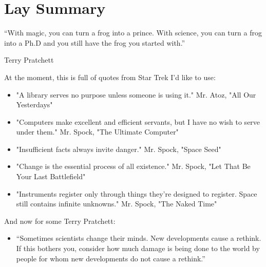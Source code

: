 \chapter{Lay Summary}
\epigraph{“With magic, you can turn a frog into a prince. With science, you can turn a frog into a Ph.D and you still have the frog you started with.”}{Terry Pratchett}

At the moment, this is full of quotes from Star Trek I'd like to use:

\begin{itemize}
    \item "A library serves no purpose unless someone is using it." Mr. Atoz, "All Our Yesterdays"
    \item "Computers make excellent and efficient servants, but I have no wish to serve under them." Mr. Spock, "The Ultimate Computer"
    \item "Insufficient facts always invite danger." Mr. Spock, "Space Seed"
    \item "Change is the essential process of all existence." Mr. Spock, "Let That Be Your Last Battlefield"
    \item "Instruments register only through things they're designed to register. Space still contains infinite unknowns." Mr. Spock, "The Naked Time"
\end{itemize}

And now for some Terry Pratchett:

\begin{itemize}
    \item “Sometimes scientists change their minds. New developments cause a rethink. If this bothers you, consider how much damage is being done to the world by people for whom new developments do not cause a rethink.”

\end{itemize}